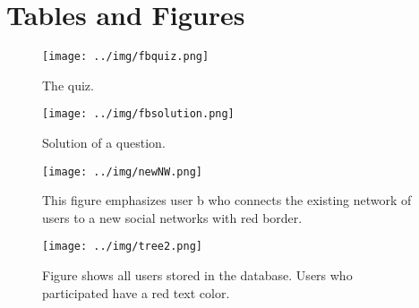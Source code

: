\documentclass[preprint,12pt]{elsarticle}
\begin{document}













\newpage
\section{Tables and Figures}
\label{sec:addendum}

\begin{figure}
  \texttt{[image: ../img/fbquiz.png]}
 \caption{The quiz.}
\label{fig:quiz}
\end{figure}


\begin{figure}
  \texttt{[image: ../img/fbsolution.png]}
  \caption{Solution of a question.}
\label{fig:solution}
\end{figure}

\begin{figure}
  \texttt{[image: ../img/newNW.png]}
 \caption{This figure emphasizes user b who connects the existing
   network of users to a new social networks with
   red border.}
\label{fig:newNW}
\end{figure}


\begin{figure}
  \texttt{[image: ../img/tree2.png]}
\caption{Figure shows all users stored in the database. Users who
  participated have a red text color.}
\label{fig:allUsers}
\end{figure}
\end{document}
